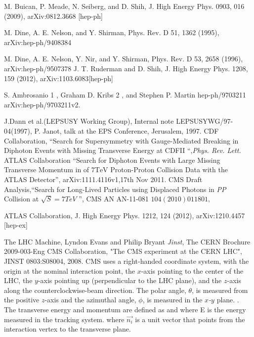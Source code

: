 \begin{thebibliography}{9}
M. Buican, P. Meade, N. Seiberg, and D. Shih, J. High Energy Phys. 0903, 016 (2009), arXiv:0812.3668 [hep-ph]

M. Dine, A. E. Nelson, and Y. Shirman, Phys. Rev. D
51, 1362 (1995), arXiv:hep-ph/9408384

M. Dine, A. E. Nelson, Y. Nir, and Y. Shirman, Phys.
Rev. D 53, 2658 (1996), arXiv:hep-ph/9507378
 J. T. Ruderman and D. Shih, J. High Energy Phys.
1208, 159 (2012), arXiv:1103.6083[hep-ph]

 S. Ambrosanio 1 , Graham D. Kribs 2 , and Stephen P. Martin hep-ph/9703211 arXiv:hep-ph/9703211v2.


J.Dann et al.(LEPSUSY Working Group), Internal note LEPSUSYWG/97-04(1997), P. Janot, talk at the EPS Conference, Jerusalem, 1997.
CDF Collaboration, ``Search for Supersymmetry with Gauge-Mediated Breaking in Diphoton Events with Missing Transverse Energy at CDFII ``,\emph{Phys. Rev. Lett.}
 ATLAS Collaboration ``Search for Diphoton Events with Large Missing Transverse Momentum in  of $\text{7TeV}$ Proton-Proton Collision Data with the ATLAS Detector'', arXiv:1111.4116v1,17th Nov 2011. 
CMS Draft Analysis,``Search for Long-Lived Particles using Displaced Photons in \emph{PP} Collision at $\sqrt{S}=7TeV$ '', CMS AN AN-11-081 \emph{$104(2010) 011801,$}

ATLAS Collaboration, J. High Energy Phys. 1212, 124
(2012), arXiv:1210.4457 [hep-ex]

 The LHC Machine, Lyndon Evans and Philip Bryant \textit{Jinst},
 The CERN Brochure 2009-003-Eng
CMS Collaboration, "The CMS experiment at the CERN LHC", JINST 0803:S08004, 2008.
CMS uses a right-handed coordinate system, with the origin at the nominal interaction point, the \emph{$x$}-axis pointing to the center of the LHC, 
the \emph{$y$}-axis pointing up (perpendicular to the LHC plane), and the \emph{$z$}-axis along the counterclockwise-beam direction. The polar angle, $\theta$, 
is measured from the positive \emph{$z$}-axis and the azimuthal angle, $\phi$, is measured in the \emph{$x$-$y$} plane. . 
The transverse energy and momentum are defined as  and  where \textsc{E} is the energy measured in the 
tracking system. where $\vec{n_{i}}$ is a unit vector that points from the interaction vertex to the transverse plane.


\end{thebibliography}
